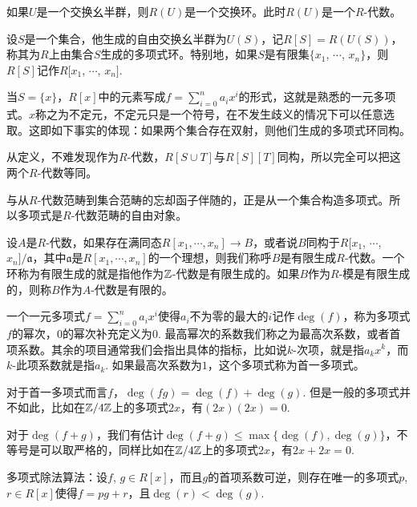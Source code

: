 如果$U$是一个交换幺半群，则$R(U)$是一个交换环。此时$R(U)$是一个$R$-代数。

\para 设$S$是一个集合，他生成的自由交换幺半群为$U(S)$，记$R[S]=R(U(S))$，称其为$R$上由集合$S$生成的多项式环。特别地，如果$S$是有限集$\{x_1$, $\cdots$, $x_n\}$，则$R[S]$记作$R[x_1$, $\cdots$, $x_n]$. 

当$S=\{x\}$，$R[x]$中的元素写成$f=\sum_{i=0}^na_ix^i$的形式，这就是熟悉的一元多项式。$x$称之为不定元，不定元只是一个符号，在不发生歧义的情况下可以任意选取。这即如下事实的体现：如果两个集合存在双射，则他们生成的多项式环同构。

从定义，不难发现作为$R$-代数，$R[S\cup T]$与$R[S][T]$同构，所以完全可以把这两个$R$-代数等同。

与从$R$-代数范畴到集合范畴的忘却函子伴随的，正是从一个集合构造多项式。所以多项式是$R$-代数范畴的自由对象。

\para 设$A$是$R$-代数，如果存在满同态$R[x_1,\cdots ,x_n]\to B$，或者说$B$同构于$R[x_1$, $\cdots$, $x_n]/\mathfrak{a}$，其中$\mathfrak{a}$是$R[x_1,\cdots ,x_n]$的一个理想，则我们称呼$B$是有限生成$R$-代数。一个环称为有限生成的就是指他作为$\mathbb{Z}$-代数是有限生成的。如果$B$作为$R$-模是有限生成的，则称$B$作为$A$-代数是有限的。

\para 一个一元多项式$f=\sum_{i=0}^na_ix^i$使得$a_i$不为零的最大的$i$记作$\deg(f)$，称为多项式$f$的幂次，$0$的幂次补充定义为$0$. 最高幂次的系数我们称之为最高次系数，或者首项系数。其余的项目通常我们会指出具体的指标，比如说$k$-次项，就是指$a_kx^k$，而$k$-此项系数就是指$a_k$. 如果最高次系数为$1$，这个多项式称为首一多项式。

对于首一多项式而言$f$，$\deg(fg)=\deg(f)+\deg(g)$. 但是一般的多项式并不如此，比如在$\mathbb{Z}/4\mathbb{Z}$上的多项式$2x$，有$(2x)(2x)=0$.

对于$\deg(f+g)$，我们有估计$\deg(f+g)\leq \max\{\deg(f),\deg(g)\}$，不等号是可以取严格的，同样比如在$\mathbb{Z}/4\mathbb{Z}$上的多项式$2x$，有$2x+2x=0$.

\begin{thm}
多项式除法算法：设$f$, $g\in R[x]$，而且$g$的首项系数可逆，则存在唯一的多项式$p$, $r\in R[x]$使得$f=pg+r$，且$\deg(r)<\deg(g)$.
\end{thm}

